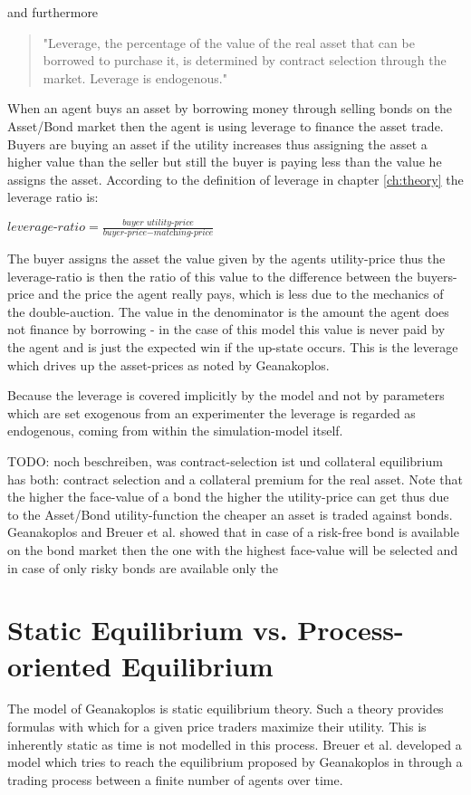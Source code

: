 \documentclass[../Bachelorarbeit.tex]{subfiles}
\begin{document}
and furthermore

\begin{quote}
"Leverage, the percentage of the value of the real asset that can be borrowed to purchase it, is determined by contract selection through the market. Leverage is endogenous."
\end{quote}

When an agent buys an asset by borrowing money through selling bonds on the Asset/Bond market then the agent is using leverage to finance the asset trade. Buyers are buying an asset if the utility increases thus assigning the asset a higher value than the seller but still the buyer is paying less than the value he assigns the asset. According to the definition of leverage in chapter \ref{ch:theory} the leverage ratio is:

\begin{center}
$\textit{leverage-ratio} = \frac{\textit{buyer utility-price}}{\textit{buyer-price} - \textit{matching-price}}$
\end{center}

The buyer assigns the asset the value given by the agents utility-price thus the leverage-ratio is then the ratio of this value to the difference between the buyers-price and the price the agent really pays, which is less due to the mechanics of the double-auction. The value in the denominator is the amount the agent does not finance by borrowing - in the case of this model this value is never paid by the agent and is just the expected win if the up-state occurs. This is the leverage which drives up the asset-prices as noted by Geanakoplos.

\medskip

Because the leverage is covered implicitly by the model and not by parameters which are set exogenous from an experimenter the leverage is regarded as endogenous, coming from within the simulation-model itself.

\medskip
TODO: noch beschreiben, was contract-selection ist und collateral equilibrium has both: contract selection and a collateral premium for the real asset.
Note that the higher the face-value of a bond the higher the utility-price can get thus due to the Asset/Bond utility-function the cheaper an asset is traded against bonds. Geanakoplos and Breuer et al. showed that in case of a risk-free bond is available on the bond market then the one with the highest face-value will be selected and in case of only risky bonds are available only the 


\section{Static Equilibrium vs. Process-oriented Equilibrium}
The model of Geanakoplos is static equilibrium theory. Such a theory provides formulas with which for a given price traders maximize their utility. This is inherently static as time is not modelled in this process. Breuer et al. developed a model which tries to reach the equilibrium proposed by Geanakoplos in \cite{Geanakoplos2009} through a trading process between a finite number of agents over time.
\end{document}
